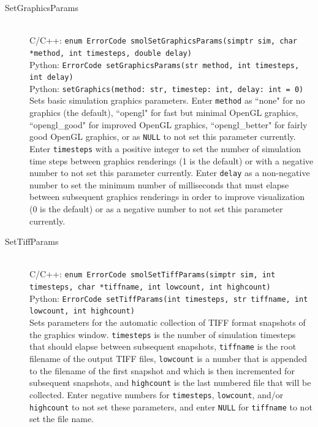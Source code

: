 \documentclass {book}
\newcommand {\ttt} {\texttt}
\begin{document}
\begin{description}

\item[SetGraphicsParams]
\hfill \\
C/C++: \ttt{enum ErrorCode smolSetGraphicsParams(simptr sim, char *method, int timesteps, double delay)}\\
Python: \ttt{ErrorCode setGraphicsParams(str method, int timesteps, int delay)}\\
Python: \ttt{setGraphics(method: str, timestep: int, delay: int = 0)}\\
Sets basic simulation graphics parameters. Enter \ttt{method} as ``none" for no graphics (the default), ``opengl" for fast but minimal OpenGL graphics, ``opengl\_good" for improved OpenGL graphics, ``opengl\_better" for fairly good OpenGL graphics, or as \ttt{NULL} to not set this parameter currently. Enter \ttt{timesteps} with a positive integer to set the number of simulation time steps between graphics renderings (1 is the default) or with a negative number to not set this parameter currently. Enter \ttt{delay} as a non-negative number to set the minimum number of milliseconds that must elapse between subsequent graphics renderings in order to improve visualization (0 is the default) or as a negative number to not set this parameter currently.

\item[SetTiffParams]
\hfill \\
C/C++: \ttt{enum ErrorCode smolSetTiffParams(simptr sim, int timesteps, char *tiffname, int lowcount, int highcount)}\\
Python: \ttt{ErrorCode setTiffParams(int timesteps, str tiffname, int lowcount, int highcount)}\\
Sets parameters for the automatic collection of TIFF format snapshots of the graphics window. \ttt{timesteps} is the number of simulation timesteps that should elapse between subsequent snapshots, \ttt{tiffname} is the root filename of the output TIFF files, \ttt{lowcount} is a number that is appended to the filename of the first snapshot and which is then incremented for subsequent snapshots, and \ttt{highcount} is the last numbered file that will be collected. Enter negative numbers for \ttt{timesteps}, \ttt{lowcount}, and/or \ttt{highcount} to not set these parameters, and enter \ttt{NULL} for \ttt{tiffname} to not set the file name.


\end{description}
\end{document}
